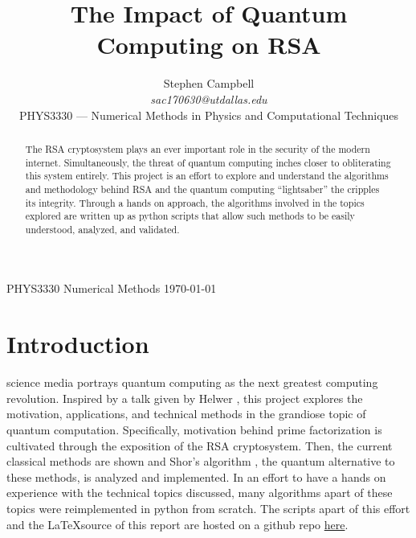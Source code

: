 \documentclass[journal]{IEEEtran}
\begin{document}
\newcommand{\eqdef}{\mathrel{:\mathop=}}

%


\title{The Impact of Quantum Computing on RSA}

\author{Stephen Campbell \\
    \emph{sac170630@utdallas.edu} \\
    PHYS3330 --- Numerical Methods in Physics and Computational Techniques
}

{PHYS3330 Numerical Methods \today}

\maketitle

\begin{abstract}
    The RSA cryptosystem plays an ever important role in the security of the modern
    internet. Simultaneously, the threat of quantum computing inches closer to
    obliterating this system entirely. This project is an effort to explore and
    understand the algorithms and methodology behind RSA and the quantum
    computing ``lightsaber'' the cripples its integrity. Through a hands on
    approach, the algorithms involved in the topics explored are written up as
    python scripts that allow such methods to be easily understood, analyzed,
    and validated.
\end{abstract}

\section{Introduction}
 science media portrays quantum computing as the next
greatest computing revolution. Inspired by a talk given by Helwer
\cite{Helwer2018}, this project explores the motivation, applications, and
technical methods in the grandiose topic of quantum computation. Specifically,
motivation behind prime factorization is cultivated through the exposition of
the RSA cryptosystem. Then, the current classical methods are shown and Shor's
algorithm \cite{Shor1997}, the quantum alternative to these methods, is analyzed
and implemented. In an effort to have a hands on experience with the technical
topics discussed, many algorithms apart of these topics were reimplemented in
python from scratch. The scripts apart of this effort and the \LaTeX  source of this report are
hosted on a github repo
\href{https://github.com/Stephen-Campbell-UTD/NM_Project_Quantum_Computing}{here}.
\end{document}
